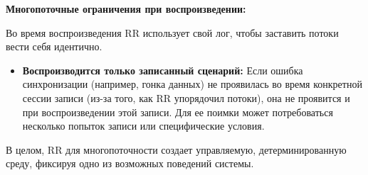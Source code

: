 \textbf{Многопоточные ограничения при воспроизведении:}

Во время воспроизведения RR использует свой лог, чтобы заставить потоки вести себя идентично.

\begin{itemize}

  \item \textbf{Воспроизводится только записанный сценарий:} Если ошибка
  синхронизации (например, гонка данных) не проявилась во время конкретной
  сессии записи (из-за того, как RR упорядочил потоки), она не проявится и при
  воспроизведении этой записи. Для ее поимки может потребоваться несколько
  попыток записи или специфические условия.

\end{itemize}

В целом, RR для многопоточности создает управляемую, детерминированную среду,
фиксируя одно из возможных поведений системы.


